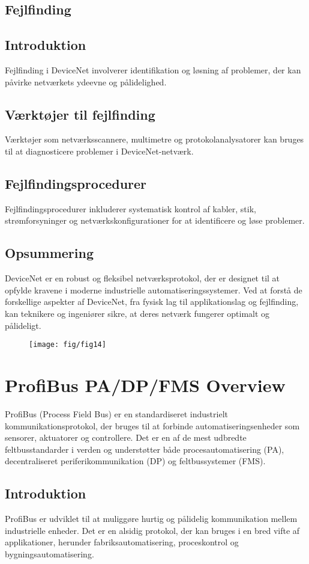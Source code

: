 \subsection{Fejlfinding}
\subsection*{Introduktion}
Fejlfinding i DeviceNet involverer identifikation og løsning af problemer, der kan påvirke netværkets ydeevne og pålidelighed.

\subsection*{Værktøjer til fejlfinding}
Værktøjer som netværksscannere, multimetre og protokolanalysatorer kan bruges til at diagnosticere problemer i DeviceNet-netværk.

\subsection*{Fejlfindingsprocedurer}
Fejlfindingsprocedurer inkluderer systematisk kontrol af kabler, stik, strømforsyninger og netværkskonfigurationer for at identificere og løse problemer.
\clearpage
\subsection{Opsummering}
DeviceNet er en robust og fleksibel netværksprotokol, der er designet til at opfylde kravene i moderne industrielle automatiseringssystemer. Ved at forstå de forskellige aspekter af DeviceNet, fra fysisk lag til applikationslag og fejlfinding, kan teknikere og ingeniører sikre, at deres netværk fungerer optimalt og pålideligt.
\begin{figure}[!h]
	\centering
	\texttt{[image: fig/fig14]}
\end{figure}
\clearpage
\section{ProfiBus PA/DP/FMS Overview}
ProfiBus (Process Field Bus) er en standardiseret industrielt kommunikationsprotokol, der bruges til at forbinde automatiseringsenheder som sensorer, aktuatorer og controllere. Det er en af de mest udbredte feltbusstandarder i verden og understøtter både procesautomatisering (PA), decentraliseret periferikommunikation (DP) og feltbussystemer (FMS).

\subsection{Introduktion}
ProfiBus er udviklet til at muliggøre hurtig og pålidelig kommunikation mellem industrielle enheder. Det er en alsidig protokol, der kan bruges i en bred vifte af applikationer, herunder fabriksautomatisering, proceskontrol og bygningsautomatisering.

